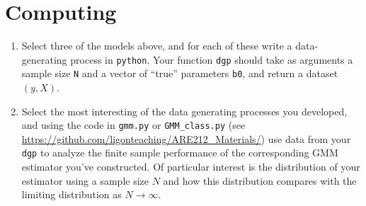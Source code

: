 \documentclass[12pt]{amsart}
\begin{document}
\section{Computing}
\label{sec:orgbb7a91c}
\begin{enumerate}
\item Select three of the models above, and for each of these
write a data-generating process in \texttt{python}.  Your function
\texttt{dgp} should take as arguments a sample size \texttt{N} and a vector of
``true'' parameters \texttt{b0}, and return a dataset \((y,X)\).
\item Select the most interesting of the data generating processes you
developed, and using the code in \texttt{gmm.py} or \texttt{GMM\_class.py} (see
\url{https://github.com/ligonteaching/ARE212\_Materials/}) use data
from your \texttt{dgp} to analyze the finite sample performance of the
corresponding GMM estimator you've constructed.  Of particular
interest is the distribution of your estimator using a sample
size \(N\) and how this distribution compares with the limiting
distribution as \(N\rightarrow\infty\).
\end{enumerate}
\end{document}
